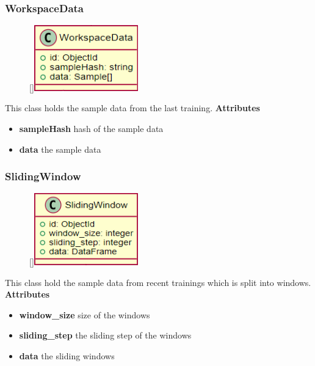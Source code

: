 \subsubsection{WorkspaceData}
\begin{figure}
    \raisebox{0pt}[\dimexpr{}\baselineskip\relax]{\includegraphics[width=4.5cm]{classes/model-management/14.png}}
\end{figure} 
\par
This class holds the sample data from the last training.
\newline
\newline
\textbf{Attributes}
\begin{itemize}
    \item \textbf{sampleHash} hash of the sample data
    \item \textbf{data} the sample data
\end{itemize}

\subsubsection{SlidingWindow}
\begin{figure}
    \raisebox{0pt}[\dimexpr{}\baselineskip\relax]{\includegraphics[width=4.5cm]{classes/model-management/15.png}}
\end{figure} 
\par
This class hold the sample data from recent trainings which is split into windows.
\newline
\newline
\textbf{Attributes}
\begin{itemize}
    \item \textbf{window\_size} size of the windows
    \item \textbf{sliding\_step} the sliding step of the windows
    \item \textbf{data} the sliding windows
\end{itemize}

